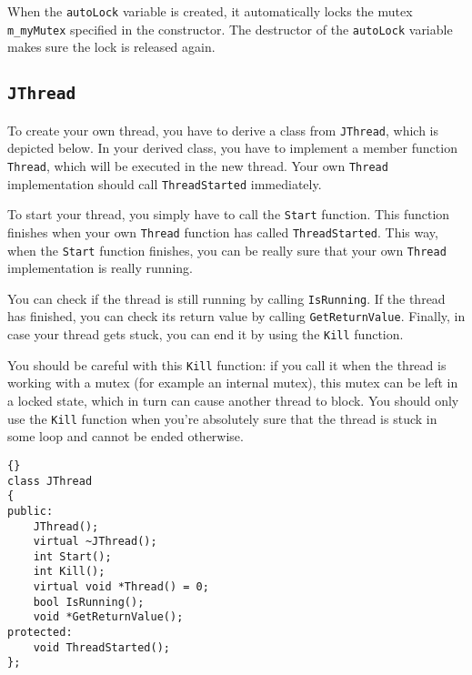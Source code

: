 \documentclass[a4paper,12pt]{article}
\begin{document}
	When the {\tt autoLock} variable is created, it automatically locks the
	mutex {\tt m\_myMutex} specified in the constructor. The destructor of
	the {\tt autoLock} variable makes sure the lock is released again.

	\subsection{{\tt JThread}}
	
	To create your own thread, you have to derive a class from {\tt JThread},
	which is depicted below. In your derived class, you have to implement
	a member function {\tt Thread}, which will be executed in the new thread.
	Your own {\tt Thread} implementation should call {\tt ThreadStarted}
	immediately.

	To start your thread, you simply have to call the {\tt Start} function.
	This function finishes when your own {\tt Thread} function has called
	{\tt ThreadStarted}. This way, when the {\tt Start} function
	finishes, you can be really sure that your own {\tt Thread} implementation
	is really running.

	You can check if the thread is still running by calling {\tt IsRunning}.
	If the thread has finished, you can check its return value by calling
	{\tt GetReturnValue}. Finally, in case your thread gets stuck, you can
	end it by using the {\tt Kill} function.

	You should be careful with this {\tt Kill} function: if you call it when
	the thread is working with a mutex (for example an internal mutex), this
	mutex can be left in a locked state, which in turn can cause another thread
	to block. You should only use the {\tt Kill} function when you're absolutely
	sure that the thread is stuck in some loop and cannot be ended otherwise.

\begin{lstlisting}[frame=tb]{}
class JThread
{
public:
	JThread();
	virtual ~JThread();
	int Start();
	int Kill();
	virtual void *Thread() = 0;
	bool IsRunning();
	void *GetReturnValue();
protected:
	void ThreadStarted();
};
\end{lstlisting}
	
\end{document}
